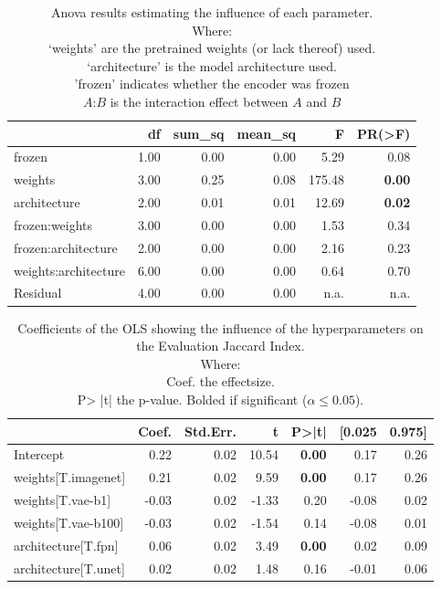 \begin{table}[ht]
\centering
\caption{Anova results estimating the influence of each parameter.\\Where: \\\hphantom{tabb}`weights' are the pretrained weights (or lack thereof) used.\\\hphantom{tabb}`architecture' is the model architecture used.\\\hphantom{tabb}'frozen' indicates whether the encoder was frozen\\\hphantom{tabb}$A$:$B$ is the interaction effect between $A$ and $B$}
\label{tab:comparison_baselines_anova_all}
\begin{tabular}{lrrrrr}
\toprule
 & df & sum\_sq & mean\_sq & F & PR(>F) \\
\midrule
frozen & 1.00 & 0.00 & 0.00 & 5.29 & 0.08 \\
weights & 3.00 & 0.25 & 0.08 & 175.48 & \textbf{0.00} \\
architecture & 2.00 & 0.01 & 0.01 & 12.69 & \textbf{0.02} \\
frozen:weights & 3.00 & 0.00 & 0.00 & 1.53 & 0.34 \\
frozen:architecture & 2.00 & 0.00 & 0.00 & 2.16 & 0.23 \\
weights:architecture & 6.00 & 0.00 & 0.00 & 0.64 & 0.70 \\
Residual & 4.00 & 0.00 & 0.00 & n.a. & n.a. \\
\bottomrule
\end{tabular}
\end{table}


\begin{table}[ht]
\centering
\caption{Coefficients of the OLS showing the influence of the hyperparameters on the Evaluation Jaccard Index.\\Where:\\\hphantom{tabb}Coef. the effectsize.\\\hphantom{tabb}P> |t| the p-value. Bolded if significant ($\alpha\le0.05$).}
\label{tab:comparison_baselines_ols_effects}
\begin{tabular}{lrrrrrr}
\toprule
 & Coef. & Std.Err. & t & P>|t| & [0.025 & 0.975] \\
\midrule
Intercept & 0.22 & 0.02 & 10.54 & \textbf{0.00} & 0.17 & 0.26 \\
weights[T.imagenet] & 0.21 & 0.02 & 9.59 & \textbf{0.00} & 0.17 & 0.26 \\
weights[T.vae-b1] & -0.03 & 0.02 & -1.33 & 0.20 & -0.08 & 0.02 \\
weights[T.vae-b100] & -0.03 & 0.02 & -1.54 & 0.14 & -0.08 & 0.01 \\
architecture[T.fpn] & 0.06 & 0.02 & 3.49 & \textbf{0.00} & 0.02 & 0.09 \\
architecture[T.unet] & 0.02 & 0.02 & 1.48 & 0.16 & -0.01 & 0.06 \\
\bottomrule
\end{tabular}
\end{table}
